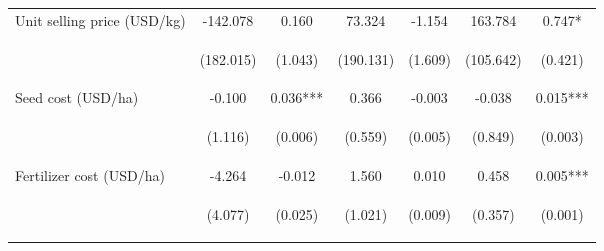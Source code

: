 \begin{center}
\begin{tabular}{lcccccc}
Unit selling price (USD/kg) & -142.078 & 0.160 & 73.324 & -1.154 & 163.784 & 0.747* \\
\vspace{4pt} & \begin{footnotesize}(182.015)\end{footnotesize} & \begin{footnotesize}(1.043)\end{footnotesize} & \begin{footnotesize}(190.131)\end{footnotesize} & \begin{footnotesize}(1.609)\end{footnotesize} & \begin{footnotesize}(105.642)\end{footnotesize} & \begin{footnotesize}(0.421)\end{footnotesize} \\
Seed cost (USD/ha) & -0.100 & 0.036*** & 0.366 & -0.003 & -0.038 & 0.015*** \\
\vspace{4pt} & \begin{footnotesize}(1.116)\end{footnotesize} & \begin{footnotesize}(0.006)\end{footnotesize} & \begin{footnotesize}(0.559)\end{footnotesize} & \begin{footnotesize}(0.005)\end{footnotesize} & \begin{footnotesize}(0.849)\end{footnotesize} & \begin{footnotesize}(0.003)\end{footnotesize} \\
Fertilizer cost (USD/ha) & -4.264 & -0.012 & 1.560 & 0.010 & 0.458 & 0.005*** \\
\vspace{4pt} & \begin{footnotesize}(4.077)\end{footnotesize} & \begin{footnotesize}(0.025)\end{footnotesize} & \begin{footnotesize}(1.021)\end{footnotesize} & \begin{footnotesize}(0.009)\end{footnotesize} & \begin{footnotesize}(0.357)\end{footnotesize} & \begin{footnotesize}(0.001)\end{footnotesize} \\

\end{tabular}
\end{center}

